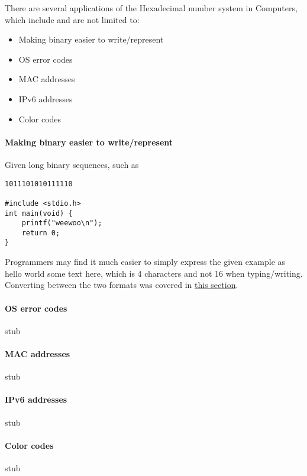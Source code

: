 \documentclass[../main.tex]{subfiles}
\begin{document}
There are several applications of the Hexadecimal number system in Computers, which include and are not limited to:

\begin{itemize}

\item Making binary easier to write/represent

\item OS error codes

\item MAC addresses

\item IPv6 addresses

\item Color codes

\end{itemize}

\paragraph{Making binary easier to write/represent}

Given long binary sequences, such as 

\begin{verbatim}
1011101010111110

#include <stdio.h>
int main(void) {
    printf("weewoo\n");
    return 0;
}

\end{verbatim}

Programmers may find it much easier to simply express the given example as {\mono hello world some text here}, which is 4 characters and not 16 when typing/writing.
Converting between the two formats was covered in \hyperref[sec:1-converting-between-bin-den-and-hexadecimal]{this section}.

\paragraph{OS error codes}
stub

\paragraph{MAC addresses}
stub

\paragraph{IPv6 addresses}
stub

\paragraph{Color codes}
stub
\end{document}
